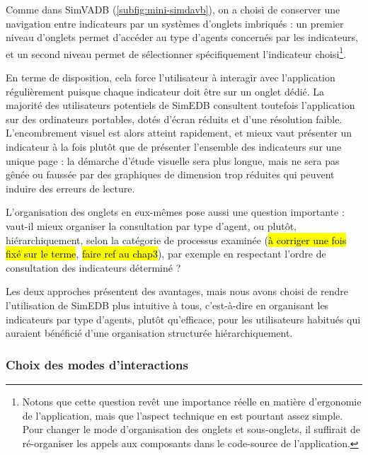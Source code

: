Comme dans SimVADB (\cref{subfig:mini-simdavb}), on a choisi de conserver une navigation entre indicateurs par un systèmes d'onglets imbriqués : un premier niveau d'onglets permet d'accéder au type d'agents concernés par les indicateurs, et un second niveau permet de sélectionner spécifiquement l'indicateur choisi\footnote{
	Notons que cette question revêt une importance réelle en matière d'ergonomie de l'application, mais que l'aspect technique en est pourtant assez simple.
	Pour changer le mode d'organisation des onglets et sous-onglets, il suffirait de ré-organiser les appels aux composants dans le code-source de l'application.
}.

En terme de disposition, cela force l'utilisateur à interagir avec l'application régulièrement puisque chaque indicateur doit être sur un onglet dédié.
La majorité des utilisateurs potentiels de SimEDB consultent toutefois l'application sur des ordinateurs portables, dotés d'écran réduits et d'une résolution faible.
L'encombrement visuel est alors atteint rapidement, et mieux vaut présenter un indicateur à la fois plutôt que de présenter l'ensemble des indicateurs sur une unique page : la démarche d'étude visuelle sera plus longue, mais ne sera pas gênée ou faussée par des graphiques de dimension trop réduites qui peuvent induire des erreurs de lecture.


L'organisation des onglets en eux-mêmes pose aussi une question importante : vaut-il mieux organiser la consultation par type d'agent, ou plutôt, hiérarchiquement, selon la catégorie de processus examinée (\hl{à corriger une fois fixé sur le terme}, \hl{faire ref au chap3}), par exemple en respectant l'ordre de consultation des indicateurs déterminé ?

Les deux approches présentent des avantages, mais nous avons choisi de rendre l'utilisation de SimEDB plus intuitive à tous, c'est-à-dire en organisant les indicateurs par type d'agents, plutôt qu'efficace, pour les utilisateurs habitués qui auraient bénéficié d'une organisation structurée hiérarchiquement.

\subsubsection{Choix des modes d'interactions}

